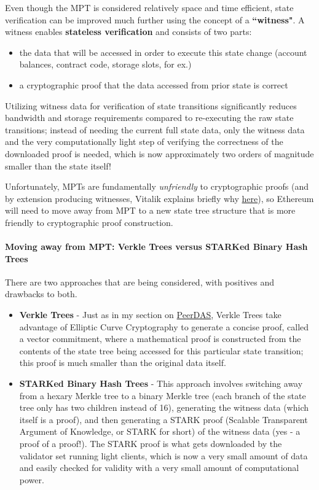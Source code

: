 \documentclass[12pt]{article}
\newcommand{\subsubsubsection}[1]{%
  \paragraph{#1}\mbox{}\par
}
\begin{document}
Even though the MPT is considered relatively space and time efficient, state verification can be improved much further using the concept of a \textbf{``witness"}. A witness enables \textbf{stateless verification} and consists of two parts: 

\begin{itemize}
    \item the data that will be accessed in order to execute this state change (account balances, contract code, storage slots, for ex.)
    \item a cryptographic proof that the data accessed from prior state is correct
\end{itemize}

Utilizing witness data for verification of state transitions significantly reduces bandwidth and storage requirements compared to re-executing the raw state transitions; instead of needing the current full state data, only the witness data and the very computationally light step of verifying the correctness of the downloaded proof is needed, which is now approximately two orders of magnitude smaller than the state itself! 

Unfortunately, MPTs are fundamentally \textit{unfriendly} to cryptographic proofs  (and by extension producing witnesses, Vitalik explains briefly why  \href{https://vitalik.eth.limo/general/2024/10/23/futures4.html\#:~:text=of\%20the\%20MPT\%3A-,It\%27s,-a\%20hexary\%20tree}{here}), so Ethereum will need to move away from MPT to a new state tree structure that is more friendly to cryptographic proof construction. 

\subsubsubsection{Moving away from MPT: Verkle Trees versus STARKed Binary Hash Trees}

There are two approaches that are being considered, with positives and drawbacks to both. 

\begin{itemize}
    \item \textbf{Verkle Trees} - Just as in my section on \hyperlink{PeerDAS}{PeerDAS}, Verkle Trees take advantage of Elliptic Curve Cryptography to generate a concise proof, called a vector commitment, where a mathematical proof is constructed from the contents of the state tree being accessed for this particular state transition; this proof is much smaller than the original data itself. 
    \item \textbf{STARKed Binary Hash Trees} - This approach involves switching away from a hexary Merkle tree to a binary Merkle tree (each branch of the state tree only has two children instead of 16), generating the witness data (which itself is a proof), and then generating a STARK proof (Scalable Transparent Argument of Knowledge, or STARK for short) of the witness data (yes - a proof of a proof!). The STARK proof is what gets downloaded by the validator set running light clients, which is now a very small amount of data and easily checked for validity with a very small amount of computational power. 
\end{itemize}
\end{document}
